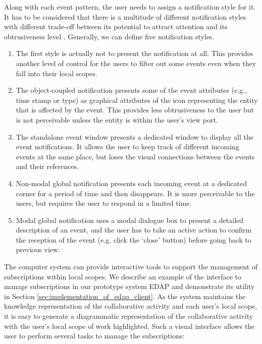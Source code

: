Along with each event pattern, the user needs to assign a notification style for it. It has to be considered that there is a multitude of different notification styles with different trade-off between its potential to attract attention and its obtrusiveness level \cite{Rauschenbach1996}. Generally, we can define five notification styles. 
\begin{enumerate}
	\item The first style is actually not to present the notification at all. This provides another level of control for the users to filter out some events even when they fall into their local scopes.
	\item The object-coupled notification presents some of the event attributes (e.g., time stamp or type) as graphical attributes of the icon representing the entity that is affected by the event. This provides less obtrusiveness to the user but is not perceivable unless the entity is within the user's view port.
	\item The standalone event window presents a dedicated window to display all the event notifications. It allows the user to keep track of different incoming events at the same place, but loses the visual connections between the events and their references.
	\item Non-modal global notification presents each incoming event at a dedicated corner for a period of time and then disappears. It is more perceivable to the users, but requires the user to respond in a limited time.
	\item Modal global notification uses a modal dialogue box to present a detailed description of an event, and the user has to take an active action to confirm the reception of the event (e.g. click the `close' button) before going back to previous view. 
\end{enumerate}

The computer system can provide interactive tools to support the management of subscriptions within local scopes. We describe an example of the interface to manage subscriptions in our prototype system EDAP and demonstrate its utility in Section \ref{sec:implementation_of_edap_client}. As the system maintains the knowledge representation of the collaborative activity and each user's local scope, it is easy to generate a diagrammatic representation of the collaborative activity with the user's local scope of work highlighted. Such a visual interface allows the user to perform several tasks to manage the subscriptions:

